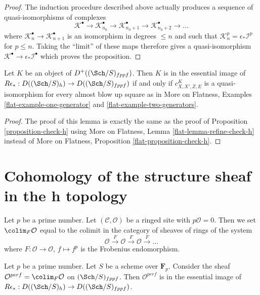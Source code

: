\begin{proof}
\medskip\noindent
The induction procedure described above actually produces a sequence of
quasi-isomorphisms of complexes
$$
\mathcal{K}^\bullet \to
\mathcal{K}_{n_0}^\bullet \to
\mathcal{K}_{n_0 + 1}^\bullet \to
\mathcal{K}_{n_0 + 2}^\bullet \to \ldots
$$
where $\mathcal{K}_n^\bullet \to \mathcal{K}_{n + 1}^\bullet$
is an isomorphism in degrees $\leq n$ and such that
$\mathcal{K}_n^p = \epsilon_*\mathcal{I}^p$ for $p \leq n$.
Taking the ``limit'' of these maps therefore gives
a quasi-isomorphism $\mathcal{K}^\bullet \to \epsilon_*\mathcal{I}^\bullet$
which proves the proposition.
\end{proof}

\begin{lemma}
\label{lemma-refine-check-h}
Let $K$ be an object of $D^+((\Sch/S)_{fppf})$. Then $K$ is in the
essential image of $R\epsilon_* : D((\Sch/S)_h) \to D((\Sch/S)_{fppf})$
if and only if $c^K_{X, X', Z, E}$ is a quasi-isomorphism
for every almost blow up square as in
More on Flatness, Examples \ref{flat-example-one-generator} and
\ref{flat-example-two-generators}.
\end{lemma}

\begin{proof}
The proof of this lemma is exactly the same as the proof of
Proposition \ref{proposition-check-h} using
More on Flatness, Lemma \ref{flat-lemma-refine-check-h}
instead of
More on Flatness, Proposition \ref{flat-proposition-check-h}.
\end{proof}






\section{Cohomology of the structure sheaf in the h topology}
\label{section-cohomology-O-h}

\noindent
Let $p$ be a prime number. Let $(\mathcal{C}, \mathcal{O})$ be a ringed site
with $p\mathcal{O} = 0$. Then we set $\colim_F \mathcal{O}$
equal to the colimit in the category of sheaves of rings of the system
$$
\mathcal{O} \xrightarrow{F} \mathcal{O} \xrightarrow{F}
\mathcal{O} \xrightarrow{F} \ldots
$$
where $F : \mathcal{O} \to \mathcal{O}$, $f \mapsto f^p$
is the Frobenius endomorphism.

\begin{lemma}
\label{lemma-h-sheaf-colim-F}
Let $p$ be a prime number. Let $S$ be a scheme over $\mathbf{F}_p$.
Consider the sheaf $\mathcal{O}^{perf} = \colim_F \mathcal{O}$
on $(\Sch/S)_{fppf}$. Then $\mathcal{O}^{perf}$ is in the essential
image of $R\epsilon_* : D((\Sch/S)_h) \to D((\Sch/S)_{fppf})$.
\end{lemma}

